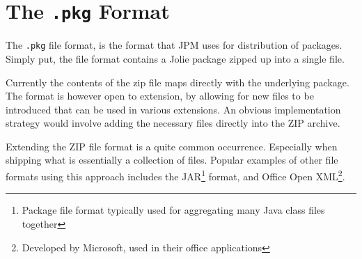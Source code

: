 \section{The {\tt .pkg} Format} \label{sec:pkg}

The \verb!.pkg! file format, is the format that JPM uses for distribution of
packages. Simply put, the file format contains a Jolie package zipped up into a
single file.

Currently the contents of the zip file maps directly with the underlying
package. The format is however open to extension, by allowing for new files to
be introduced that can be used in various extensions. An obvious implementation
strategy would involve adding the necessary files directly into the ZIP
archive.

Extending the ZIP file format is a quite common occurrence. Especially when
shipping what is essentially a collection of files. Popular examples of other
file formats using this approach includes the JAR\footnote{Package file format
typically used for aggregating many Java class files together}\autocite{JAR}
format, and Office Open XML\footnote{Developed by Microsoft, used in their
office applications}\autocite{OOXA}.
